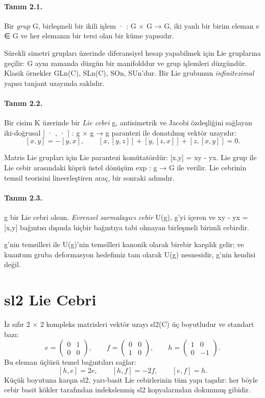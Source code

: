 \documentclass[12pt,a4paper]{report}
\numberwithin{equation}{chapter}
\theoremstyle{plain}
\theoremstyle{definition}
\begin{document}
\paragraph{Tanım 2.1.}
Bir \emph{grup} G, birleşmeli bir ikili işlem · : G × G → G,
iki yanlı bir birim eleman e ∈ G ve her elemanın bir tersi olan bir
küme yapısıdır.


Sürekli simetri grupları üzerinde diferansiyel hesap yapabilmek için Lie
gruplarına geçilir: G aynı zamanda düzgün bir manifolddur ve grup
işlemleri düzgündür. Klasik örnekler GLn(C), SLn(C),
SOn, SUn'dur. Bir Lie grubunun \emph{infinitezimal}
yapısı tanjant uzayında saklıdır.

\paragraph{Tanım 2.2.}
Bir cisim K üzerinde bir \emph{Lie cebri} g, antisimetrik ve Jacobi
özdeşliğini sağlayan iki-doğrusal [ · , · ] : g × g → g
parantezi ile donatılmış vektör uzayıdır:
\[
  [x,y] = -[y,x], \qquad
  [x,[y,z]] + [y,[z,x]] + [z,[x,y]] = 0.
\]


Matris Lie grupları için Lie parantezi komütatördür: [x,y] = xy - yx.
Lie grup ile Lie cebir arasındaki köprü üstel dönüşüm exp : g → G ile
verilir. Lie cebrinin temsil teorisini lineerleştiren araç, bir sonraki
adımdır.

\paragraph{Tanım 2.3.}
g bir Lie cebri olsun. \emph{Evrensel sarmalayıcı cebir} U(g),
g'yi içeren ve xy - yx = [x,y] bağıntısı dışında hiçbir bağıntıya
tabi olmayan birleşmeli birimli cebirdir.


g'nin temsilleri ile U(g)'nin temsilleri kanonik olarak birebir
karşılık gelir; ve kuantum gruba deformasyon hedefimiz tam olarak U(g)
nesnesidir, g'nin kendisi değil.

\section{sl2 Lie Cebri}

İz sıfır 2 × 2 kompleks matrisleri vektör uzayı sl2(C) üç
boyutludur ve standart bazı:
\[
  e = \begin{pmatrix} 0 & 1 \\ 0 & 0 \end{pmatrix},\qquad
  f = \begin{pmatrix} 0 & 0 \\ 1 & 0 \end{pmatrix},\qquad
  h = \begin{pmatrix} 1 & 0 \\ 0 & -1 \end{pmatrix}.
\]
Bu eleman üçlüsü temel bağıntıları sağlar:
\begin{equation}\label{eq:sl2-rels}
  [h,e] = 2e, \qquad [h,f] = -2f, \qquad [e,f] = h.
\end{equation}
Küçük boyutuna karşın sl2, yarı-basit Lie cebirlerinin tüm yapı
taşıdır: her böyle cebir basit kökler tarafından indekslenmiş sl2
kopyalarından dokunmuş gibidir.
\end{document}

